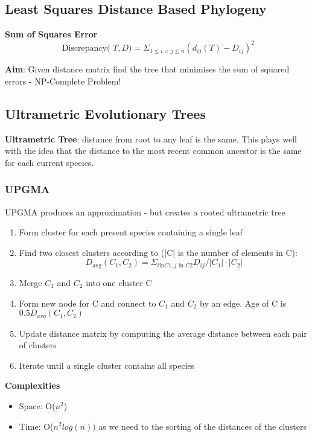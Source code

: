 \documentclass{article}
\begin{document}
\subsection{Least Squares Distance Based Phylogeny}
\textbf{Sum of Squares Error}
$$
\text { Discrepancy( }T, D)=\Sigma_{1 \leq i<j \leq n}\left(d_{i j}(T)-D_{i j}\right)^{2}
$$

\textbf{Aim}: Given distance matrix find the tree that minimises the sum of squared errors - NP-Complete Problem!

\subsection{Ultrametric Evolutionary Trees}
\textbf{Ultrametric Tree}: distance from root to any leaf is the same. This plays well with the idea that the distance to the most recent common ancestor is the same for each current species.

\subsubsection{UPGMA}
UPGMA produces an approximation - but creates a rooted ultrametric tree
\begin{enumerate}
    \item Form cluster for each present species containing a single leaf
    \item Find two closest clusters according to (|C| is the number of elements in C):
    $$
D_{\mathrm{avg}}\left(C_{1}, C_{2}\right)=\Sigma_{i \mathrm{in} C 1, j \text { in } C 2} D_{i j} /\left|C_{1}\right| \cdot\left|C_{2}\right|
$$

    \item Merge $C_{1}$ and $C_{2}$ into one cluster C
    \item Form new node for C and connect to $C_{1}$ and $C_{2}$ by an edge. Age of C is $0.5 D_{avg}(C_{1}, C_{2})$
    \item Update distance matrix by computing the average distance between each pair of clusters
    \item Iterate until a single cluster contains all species
\end{enumerate}

\textbf{Complexities}
\begin{itemize}
    \item Space: O($n^{2}$)
    \item Time: O($n^{2}log(n))$ as we need to the sorting of the distances of the clusters
\end{itemize}
\end{document}
